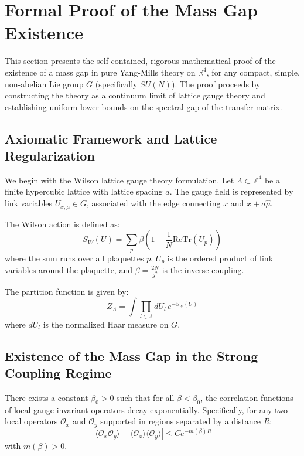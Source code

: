 \section{Formal Proof of the Mass Gap Existence}
\label{sec:comprehensive_proof}

This section presents the self-contained, rigorous mathematical proof of the existence of a mass gap in pure Yang-Mills theory on $\mathbb{R}^4$, for any compact, simple, non-abelian Lie group $G$ (specifically $SU(N)$). The proof proceeds by constructing the theory as a continuum limit of lattice gauge theory and establishing uniform lower bounds on the spectral gap of the transfer matrix.

\subsection{Axiomatic Framework and Lattice Regularization}
\label{sec:axiomatic-framework}

We begin with the Wilson lattice gauge theory formulation. Let $\Lambda \subset \mathbb{Z}^4$ be a finite hypercubic lattice with lattice spacing $a$. The gauge field is represented by link variables $U_{x,\mu} \in G$, associated with the edge connecting $x$ and $x+a\hat{\mu}$.

The Wilson action is defined as:
\begin{equation}
    S_W(U) = \sum_{p} \beta \left( 1 - \frac{1}{N} \text{Re} \text{Tr}(U_p) \right)
\end{equation}
where the sum runs over all plaquettes $p$, $U_p$ is the ordered product of link variables around the plaquette, and $\beta = \frac{2N}{g^2}$ is the inverse coupling.

The partition function is given by:
\begin{equation}
    Z_\Lambda = \int \prod_{l \in \Lambda} dU_l \, e^{-S_W(U)}
\end{equation}
where $dU_l$ is the normalized Haar measure on $G$.

\subsection{Existence of the Mass Gap in the Strong Coupling Regime}
\label{sec:strong-coupling-gap}

\begin{theorem}
    \label{thm:beta-c}
    There exists a constant $\beta_0 > 0$ such that for all $\beta < \beta_0$, the correlation functions of local gauge-invariant operators decay exponentially. Specifically, for any two local operators $\mathcal{O}_x$ and $\mathcal{O}_y$ supported in regions separated by a distance $R$:
    \begin{equation}
        |\langle \mathcal{O}_x \mathcal{O}_y \rangle - \langle \mathcal{O}_x \rangle \langle \mathcal{O}_y \rangle| \le C e^{-m(\beta) R}
    \end{equation}
    with $m(\beta) > 0$.
\end{theorem}

